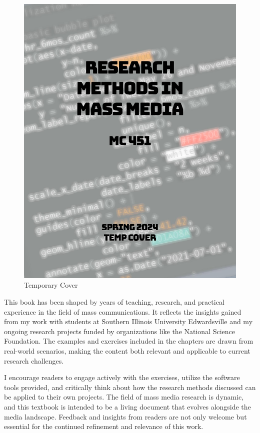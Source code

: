 \documentclass[
]{book}
\begin{document}
\begin{figure}
\centering
\includegraphics[width=1\textwidth,height=\textheight]{images/cover.jpg}
\caption{Temporary Cover}
\end{figure}

This book has been shaped by years of teaching, research, and practical experience in the field of mass communications. It reflects the insights gained from my work with students at Southern Illinois University Edwardsville and my ongoing research projects funded by organizations like the National Science Foundation. The examples and exercises included in the chapters are drawn from real-world scenarios, making the content both relevant and applicable to current research challenges.

I encourage readers to engage actively with the exercises, utilize the software tools provided, and critically think about how the research methods discussed can be applied to their own projects. The field of mass media research is dynamic, and this textbook is intended to be a living document that evolves alongside the media landscape. Feedback and insights from readers are not only welcome but essential for the continued refinement and relevance of this work.
\end{document}
